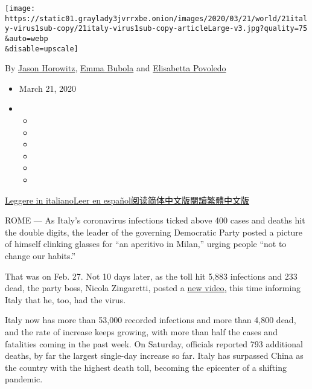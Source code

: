 \texttt{[image: https://static01.graylady3jvrrxbe.onion/images/2020/03/21/world/21italy-virus1sub-copy/21italy-virus1sub-copy-articleLarge-v3.jpg?quality=75\\\&auto=webp\\\&disable=upscale]}

By \href{https://www.nytimes3xbfgragh.onion/by/jason-horowitz}{Jason
Horowitz}, \href{https://www.nytimes3xbfgragh.onion/by/emma-bubola}{Emma
Bubola} and
\href{https://www.nytimes3xbfgragh.onion/by/elisabetta-povoledo}{Elisabetta
Povoledo}

\begin{itemize}
\item
  March 21, 2020
\item
  \begin{itemize}
  \item
  \item
  \item
  \item
  \item
  \item
  \end{itemize}
\end{itemize}

\href{https://www.nytimes3xbfgragh.onion/it/2020/03/22/world/europe/litalia-pandemia.html}{Leggere
in
italiano}\href{https://www.nytimes3xbfgragh.onion/es/2020/03/22/espanol/coronavirus-lecciones-italia.html}{Leer
en
español}\href{https://cn.nytimes3xbfgragh.onion/world/20200323/italy-coronavirus-center-lessons/}{阅读简体中文版}\href{https://cn.nytimes3xbfgragh.onion/world/20200323/italy-coronavirus-center-lessons/zh-hant/}{閱讀繁體中文版}

ROME --- As Italy's coronavirus infections ticked above 400 cases and
deaths hit the double digits, the leader of the governing Democratic
Party posted a picture of himself clinking glasses for ``an aperitivo in
Milan,'' urging people ``not to change our habits.''

That was on Feb. 27. Not 10 days later, as the toll hit 5,883 infections
and 233 dead, the party boss, Nicola Zingaretti, posted a
\href{https://www.nytimes3xbfgragh.onion/2020/03/07/world/europe/coronavirus-italy.html}{new
video,} this time informing Italy that he, too, had the virus.

Italy now has more than 53,000 recorded infections and more than 4,800
dead, and the rate of increase keeps growing, with more than half the
cases and fatalities coming in the past week. On Saturday, officials
reported 793 additional deaths, by far the largest single-day increase
so far. Italy has surpassed China as the country with the highest death
toll, becoming the epicenter of a shifting pandemic.

